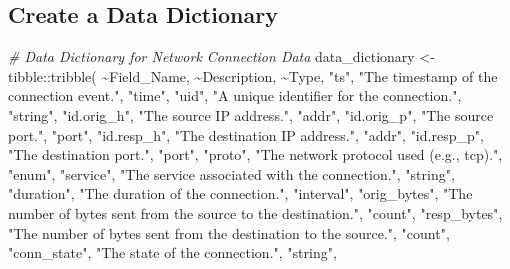 \documentclass[
]{article}
\newenvironment{Shaded}{\begin{snugshade}}{\end{snugshade}}
\newcommand{\CommentTok}[1]{\textcolor[rgb]{0.56,0.35,0.01}{\textit{#1}}}
\newcommand{\FunctionTok}[1]{\textcolor[rgb]{0.00,0.00,0.00}{#1}}
\newcommand{\NormalTok}[1]{#1}
\newcommand{\OtherTok}[1]{\textcolor[rgb]{0.56,0.35,0.01}{#1}}
\newcommand{\SpecialCharTok}[1]{\textcolor[rgb]{0.00,0.00,0.00}{#1}}
\newcommand{\StringTok}[1]{\textcolor[rgb]{0.31,0.60,0.02}{#1}}
\begin{document}
\hypertarget{create-a-data-dictionary}{%
\subsection{Create a Data Dictionary}\label{create-a-data-dictionary}}

\begin{Shaded}
\begin{Highlighting}[]
\CommentTok{\# Data Dictionary for Network Connection Data}
\NormalTok{data\_dictionary }\OtherTok{\textless{}{-}}\NormalTok{ tibble}\SpecialCharTok{::}\FunctionTok{tribble}\NormalTok{(}
  \SpecialCharTok{\textasciitilde{}}\NormalTok{Field\_Name,     }\SpecialCharTok{\textasciitilde{}}\NormalTok{Description,                                   }\SpecialCharTok{\textasciitilde{}}\NormalTok{Type,}
  \StringTok{"ts"}\NormalTok{,            }\StringTok{"The timestamp of the connection event."}\NormalTok{,      }\StringTok{"time"}\NormalTok{,}
  \StringTok{"uid"}\NormalTok{,           }\StringTok{"A unique identifier for the connection."}\NormalTok{,     }\StringTok{"string"}\NormalTok{,}
  \StringTok{"id.orig\_h"}\NormalTok{,     }\StringTok{"The source IP address."}\NormalTok{,                      }\StringTok{"addr"}\NormalTok{,}
  \StringTok{"id.orig\_p"}\NormalTok{,     }\StringTok{"The source port."}\NormalTok{,                            }\StringTok{"port"}\NormalTok{,}
  \StringTok{"id.resp\_h"}\NormalTok{,     }\StringTok{"The destination IP address."}\NormalTok{,                 }\StringTok{"addr"}\NormalTok{,}
  \StringTok{"id.resp\_p"}\NormalTok{,     }\StringTok{"The destination port."}\NormalTok{,                       }\StringTok{"port"}\NormalTok{,}
  \StringTok{"proto"}\NormalTok{,         }\StringTok{"The network protocol used (e.g., \textquotesingle{}tcp\textquotesingle{})."}\NormalTok{,    }\StringTok{"enum"}\NormalTok{,}
  \StringTok{"service"}\NormalTok{,       }\StringTok{"The service associated with the connection."}\NormalTok{, }\StringTok{"string"}\NormalTok{,}
  \StringTok{"duration"}\NormalTok{,      }\StringTok{"The duration of the connection."}\NormalTok{,             }\StringTok{"interval"}\NormalTok{,}
  \StringTok{"orig\_bytes"}\NormalTok{,    }\StringTok{"The number of bytes sent from the source to the destination."}\NormalTok{, }\StringTok{"count"}\NormalTok{,}
  \StringTok{"resp\_bytes"}\NormalTok{,    }\StringTok{"The number of bytes sent from the destination to the source."}\NormalTok{, }\StringTok{"count"}\NormalTok{,}
  \StringTok{"conn\_state"}\NormalTok{,    }\StringTok{"The state of the connection."}\NormalTok{,                }\StringTok{"string"}\NormalTok{,}

\end{Highlighting}
\end{Shaded}
\end{document}

